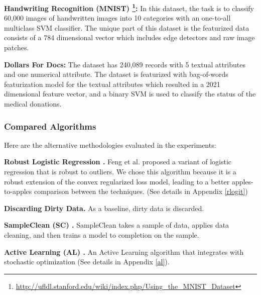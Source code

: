\vspace{0.25em}

\noindent\textbf{Handwriting Recognition (MNIST) \footnote{\scriptsize\url{http://ufldl.stanford.edu/wiki/index.php/Using_the_MNIST_Dataset}}: } In this dataset, the task is to classify 60,000 images of handwritten images into 10 categories with an one-to-all multiclass SVM classifier. The unique part of this dataset is the featurized data consists of a 784 dimensional vector which includes edge detectors and raw image patches. 

\vspace{0.25em}

\noindent\textbf{Dollars For Docs: } The dataset has 240,089 records with 5 textual attributes and one numerical attribute.
The dataset is featurized with bag-of-words featurization model for the textual attributes which resulted in a 2021 dimensional feature vector, and a binary SVM is used to classify the status of the medical donations.

\subsubsection{Compared Algorithms}
\noindent Here are the alternative methodologies evaluated in the experiments:

\vspace{0.25em}

\noindent\textbf{Robust Logistic Regression \cite{feng2014robust}. } Feng et al. proposed a variant of logistic regression that is robust to outliers. We chose this algorithm because it is a robust extension of the convex regularized loss model, leading to a better apples-to-apples comparison between the techniques. (See details in Appendix \ref{rlogit})  

\vspace{0.25em}

\noindent\textbf{Discarding Dirty Data. } As a baseline, dirty data is discarded.

\vspace{0.25em}

\noindent\textbf{SampleClean (SC) \cite{wang1999sample}. } SampleClean takes a sample of data, applies data cleaning, and then trains a model to completion on the sample.

\vspace{0.25em}

\noindent\textbf{Active Learning (AL) \cite{guillory2009active}. } An Active Learning algorithm that integrates with stochastic optimization (See details in Appendix \ref{al}). 

